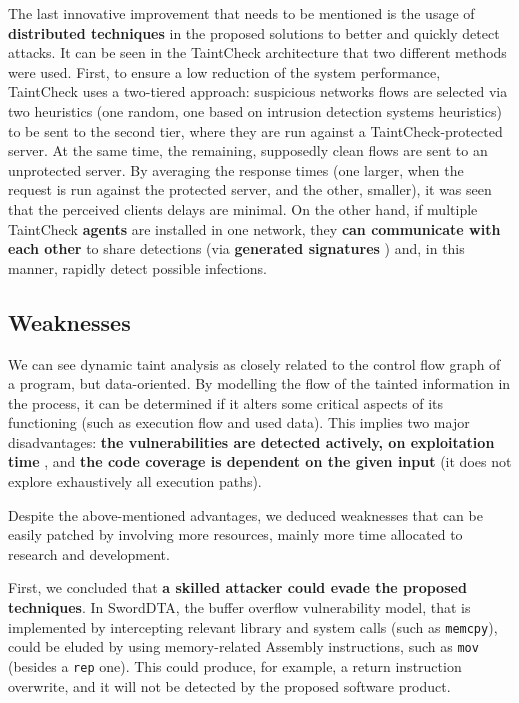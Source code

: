 \documentclass[10pt,a4paper,english,onecolumn]{IEEEtran}
\begin{document}
The last innovative improvement that needs to be mentioned is the usage of \textbf{distributed techniques} in the proposed solutions to better and quickly detect attacks. It can be seen in the TaintCheck architecture that two different methods were used. First, to ensure a low reduction of the system performance, TaintCheck uses a two-tiered approach: suspicious networks flows are selected via two heuristics (one random, one based on intrusion detection systems heuristics) to be sent to the second tier, where they are run against a TaintCheck-protected server. At the same time, the remaining, supposedly clean flows are sent to an unprotected server. By averaging the response times (one larger, when the request is run against the protected server, and the other, smaller), it was seen that the perceived clients delays are minimal. On the other hand, if multiple TaintCheck \textbf{agents} are installed in one network, they \textbf{can communicate with each other} to share detections (via \textbf{generated signatures} ) and, in this manner, rapidly detect possible infections.

\subsection{Weaknesses}

We can see dynamic taint analysis as closely related to the control flow graph of a program, but data-oriented. By modelling the flow of the tainted information in the process, it can be determined if it alters some critical aspects of its functioning (such as execution flow and used data). This implies two major disadvantages: \textbf{the vulnerabilities are detected actively, on exploitation time} , and \textbf{the code coverage is dependent on the given input} (it does not explore exhaustively all execution paths).

Despite the above-mentioned advantages, we deduced weaknesses that can be easily patched by involving more resources, mainly more time allocated to research and development.

First, we concluded that \textbf{a skilled attacker could evade the proposed techniques}. In SwordDTA, the buffer overflow vulnerability model, that is implemented by intercepting relevant library and system calls (such as \texttt{memcpy}), could be eluded by using memory-related Assembly instructions, such as \texttt{mov} (besides a \texttt{rep} one). This could produce, for example, a return instruction overwrite, and it will not be detected by the proposed software product.
\end{document}
